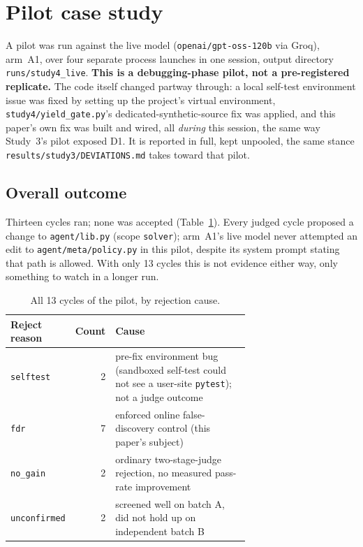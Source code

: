 \documentclass[11pt]{article}
\begin{document}
\section{Pilot case study}
\label{sec:case}

A pilot was run against the live model (\texttt{openai/gpt-oss-120b} via Groq), arm~A1, over four separate process launches in one session, output directory \texttt{runs/study4\_live}. \textbf{This is a debugging-phase pilot, not a pre-registered replicate.} The code itself changed partway through: a local self-test environment issue was fixed by setting up the project's virtual environment, \texttt{study4/yield\_gate.py}'s dedicated-synthetic-source fix was applied, and this paper's own fix was built and wired, all \emph{during} this session, the same way Study~3's pilot exposed D1. It is reported in full, kept unpooled, the same stance \texttt{results/study3/}\allowbreak\texttt{DEVIATIONS.md} takes toward that pilot.

\subsection{Overall outcome}

Thirteen cycles ran; none was accepted (Table~\ref{tab:breakdown}). Every judged cycle proposed a change to \texttt{agent/lib.py} (scope \texttt{solver}); arm~A1's live model never attempted an edit to \texttt{agent/meta/policy.py} in this pilot, despite its system prompt stating that path is allowed. With only 13 cycles this is not evidence either way, only something to watch in a longer run.

\begin{table}[h]
\centering\small
\caption{All 13 cycles of the pilot, by rejection cause.}
\label{tab:breakdown}
\begin{tabular}{@{}lrp{0.68\linewidth}@{}}
\toprule
Reject reason & Count & Cause \\
\midrule
\texttt{selftest} & 2 & pre-fix environment bug (sandboxed self-test could not see a user-site \texttt{pytest}); not a judge outcome \\
\texttt{fdr} & 7 & enforced online false-discovery control (this paper's subject) \\
\texttt{no\_gain} & 2 & ordinary two-stage-judge rejection, no measured pass-rate improvement \\
\texttt{unconfirmed} & 2 & screened well on batch A, did not hold up on independent batch B \\
\bottomrule
\end{tabular}
\end{table}
\end{document}
